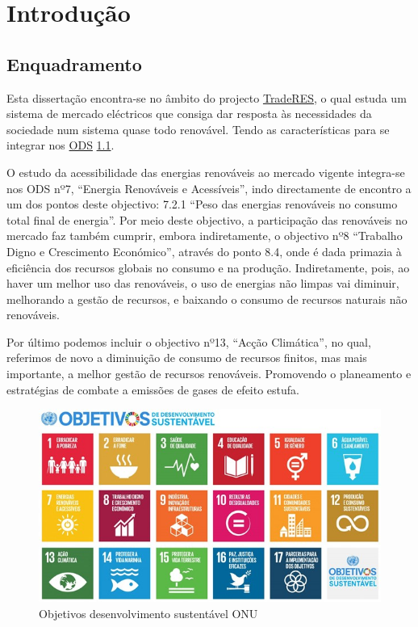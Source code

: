\chapter{Introdução \label{ch:introducao}}

\section{Enquadramento \label{se:enquadramento}}
Esta dissertação encontra-se no âmbito do projecto \href{https://traderes.eu/}{TradeRES}, o qual estuda um sistema de mercado eléctricos que consiga dar resposta às necessidades da sociedade num sistema quase todo renovável. Tendo as características para se integrar nos \href{https://ods.pt/ods/}{ODS} \ref{fig:ODS}.

O estudo da acessibilidade das energias renováveis ao mercado vigente integra-se nos ODS nº7, “Energia Renováveis e Acessíveis”, indo directamente de encontro a um dos pontos deste objectivo: 7.2.1 “Peso das energias renováveis no consumo total final de energia”. Por meio deste objectivo, a participação das renováveis no mercado faz também cumprir, embora indiretamente, o objectivo nº8 “Trabalho Digno e Crescimento Económico”, através do ponto 8.4, onde é dada primazia à eficiência dos recursos globais no consumo e na produção. Indiretamente, pois, ao haver um melhor uso das renováveis, o uso de energias não limpas vai diminuir, melhorando a gestão de recursos, e baixando o consumo de recursos naturais não renováveis.

Por último podemos incluir o objectivo nº13, “Acção Climática”, no qual, referimos de novo a diminuição de consumo de recursos finitos, mas mais importante, a melhor gestão de recursos renováveis. Promovendo o planeamento e estratégias de combate a emissões de gases de efeito estufa.


\begin{figure}[h]
    \centering
    \includegraphics{Imagens/DesenvolvimentoSustentavel.jpg}
    \caption{Objetivos desenvolvimento sustentável ONU}
    \label{fig:ODS}
\end{figure}


